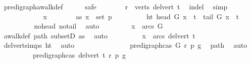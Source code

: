 \begin{isabellebody}
\ pre{\isacharunderscore}{\kern0pt}digraph{\isachardot}{\kern0pt}awalk{\isacharunderscore}{\kern0pt}def\isanewline
\ \ \ \ \isamarkupfalse%
\ safe\isanewline
\ \ \ \ \ \ \isamarkupfalse%
\ {\isachardoublequoteopen}r\ {\isasymin}\ verts\ {\isacharparenleft}{\kern0pt}del{\isacharunderscore}{\kern0pt}vert\ t{\isacharparenright}{\kern0pt}{\isachardoublequoteclose}\ \isamarkupfalse%
\ in{\isacharunderscore}{\kern0pt}del\ \isamarkupfalse%
\ simp\ \ \ \isanewline
\ \ \ \ \isamarkupfalse%
\isanewline
\ \ \ \ \ \ \isamarkupfalse%
\ x\isanewline
\ \ \ \ \ \ \isamarkupfalse%
\ as{}{\isacharcolon}{\kern0pt}\ {\isachardoublequoteopen}x\ {\isasymin}\ set\ p{\isachardoublequoteclose}\isanewline
\ \ \ \ \ \ \isamarkupfalse%
\ \isamarkupfalse%
\ ht{\isacharcolon}{\kern0pt}\ {\isachardoublequoteopen}head\ G\ x\ {\isasymnoteq}\ t\ {\isasymand}\ tail\ G\ x\ {\isasymnoteq}\ t{\isachardoublequoteclose}\isanewline
\ \ \ \ \ \ \ \ \isamarkupfalse%
\ no{\isacharunderscore}{\kern0pt}head\ no{\isacharunderscore}{\kern0pt}tail\ \isamarkupfalse%
\ auto\isanewline
\ \ \ \ \ \ \isamarkupfalse%
\ {\isachardoublequoteopen}\ x\ {\isasymin}\ arcs\ G{\isachardoublequoteclose}\ \isanewline
\ \ \ \ \ \ \ \ \isamarkupfalse%
\ awalk{\isacharunderscore}{\kern0pt}def\ path\ subsetD\ as{}\ \isamarkupfalse%
\ auto\isanewline
\ \ \ \ \ \ \isamarkupfalse%
\ \isamarkupfalse%
\ {\isachardoublequoteopen}x\ {\isasymin}\ arcs\ {\isacharparenleft}{\kern0pt}del{\isacharunderscore}{\kern0pt}vert\ t{\isacharparenright}{\kern0pt}{\isachardoublequoteclose}\ \isamarkupfalse%
\ del{\isacharunderscore}{\kern0pt}vert{\isacharunderscore}{\kern0pt}simps{\isacharparenleft}{\kern0pt}{}{\isacharparenright}{\kern0pt}\ ht\ \isamarkupfalse%
\ auto\ \ \ \isanewline
\ \ \ \ \isamarkupfalse%
\isanewline
\ \ \ \ \ \ \isamarkupfalse%
\ {\isachardoublequoteopen}pre{\isacharunderscore}{\kern0pt}digraph{\isachardot}{\kern0pt}cas\ G\ r\ p\ g{\isachardoublequoteclose}\ \isamarkupfalse%
\ path\ \isamarkupfalse%
\ auto\isanewline
\ \ \ \ \ \ \isamarkupfalse%
\ \isamarkupfalse%
\ {\isachardoublequoteopen}pre{\isacharunderscore}{\kern0pt}digraph{\isachardot}{\kern0pt}cas\ {\isacharparenleft}{\kern0pt}del{\isacharunderscore}{\kern0pt}vert\ t{\isacharparenright}{\kern0pt}\ r\ p\ g{\isachardoublequoteclose}\isanewline

\end{isabellebody}
